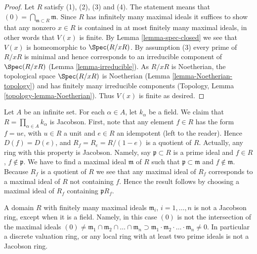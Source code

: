 \begin{proof}
Let $R$ satisfy (1), (2), (3) and (4). The statement
means that $(0) = \bigcap_{\mathfrak m \subset R} \mathfrak m$.
Since $R$ has infinitely many maximal ideals it suffices to
show that any nonzero $x \in R$ is contained in at most
finitely many maximal ideals, in other words that $V(x)$ is finite.
By Lemma \ref{lemma-spec-closed}
we see that $V(x)$ is homeomorphic to $\Spec(R/xR)$.
By assumption (3) every prime of $R/xR$ is minimal and hence
corresponds to an irreducible component of $\Spec(R/xR)$
(Lemma \ref{lemma-irreducible}).
As $R/xR$ is Noetherian, the topological space $\Spec(R/xR)$
is Noetherian (Lemma \ref{lemma-Noetherian-topology})
and has finitely many irreducible components
(Topology, Lemma \ref{topology-lemma-Noetherian}).
Thus $V(x)$ is finite as desired.
\end{proof}

\begin{example}
\label{example-infinite-product-fields-jacobson}
Let $A$ be an infinite set.
For each $\alpha \in A$, let $k_\alpha$ be a field.
We claim that $R = \prod_{\alpha\in A} k_\alpha$ is Jacobson.
First, note that any element $f \in R$ has the form
$f = ue$, with $u \in R$ a unit and $e\in R$ an idempotent
(left to the reader).
Hence $D(f) = D(e)$, and $R_f = R_e = R/(1-e)$ is a quotient of $R$.
Actually, any ring with this property is Jacobson.
Namely, say $\mathfrak p \subset R$ is a prime ideal
and $f \in R$, $f \not \in \mathfrak p$. We have to find
a maximal ideal $\mathfrak m$ of $R$ such that
$\mathfrak p \subset \mathfrak m$ and $f \not\in \mathfrak m$.
Because $R_f$ is a quotient of $R$ we see that any maximal
ideal of $R_f$ corresponds to a maximal ideal of $R$
not containing $f$. Hence the result follows
by choosing a maximal ideal of $R_f$ containing $\mathfrak p R_f$.
\end{example}

\begin{example}
\label{example-not-jacobson}
A domain $R$ with finitely many maximal ideals
$\mathfrak m_i$, $i = 1, \ldots, n$ is not a
Jacobson ring, except when it is a field.
Namely, in this case $(0)$ is not the intersection
of the maximal ideals $(0) \not =
\mathfrak m_1 \cap \mathfrak m_2 \cap \ldots \cap \mathfrak m_n
\supset \mathfrak m_1 \cdot \mathfrak m_2 \cdot \ldots
\cdot \mathfrak m_n \not = 0$.
In particular a discrete valuation ring, or any local ring with
at least two prime ideals is not a Jacobson
ring.
\end{example}

